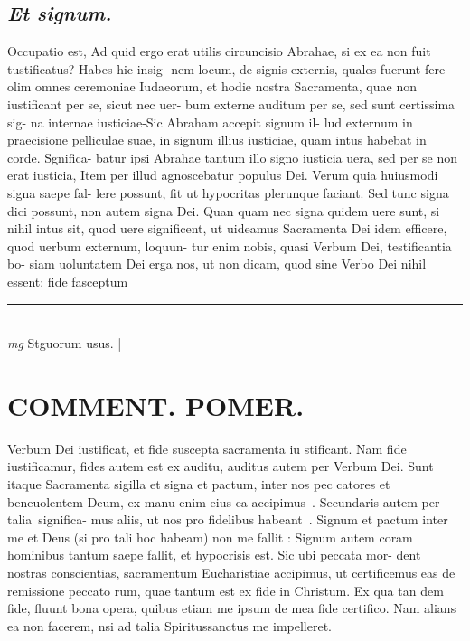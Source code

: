 \documentclass{article}
\begin{document}
\begin{pages}
\subsection*{\textit{Et signum. }}\pstart Occupatio est, Ad quid ergo erat utilis circuncisio Abrahae, si ex ea non fuit tustificatus? Habes hic insig- nem locum, de signis externis, quales fuerunt fere olim omnes ceremoniae Iudaeorum, et hodie nostra Sacramenta, quae non iustificant per se, sicut nec uer- bum externe auditum per se, sed sunt certissima sig- na internae iusticiae-Sic Abraham accepit signum il- lud externum in praecisione pelliculae suae, in signum illius iusticiae, quam intus habebat in corde. Sgnifica- batur ipsi Abrahae tantum illo signo iusticia uera, sed per se non erat iusticia, Item per illud agnoscebatur populus Dei. Verum quia huiusmodi signa saepe fal- lere possunt, fit ut hypocritas plerunque faciant. Sed tunc signa dici possunt, non autem signa Dei. Quan quam nec signa quidem uere sunt, si nihil intus sit, quod uere significent, ut uideamus Sacramenta Dei idem efficere, quod uerbum externum, loquun- tur enim nobis, quasi Verbum Dei, testificantia bo- siam uoluntatem Dei erga nos, ut non dicam, quod sine Verbo Dei nihil essent: fide fasceptum  \pend\pstart  \pend
\vspace{0.5cm}\noindent
\vspace{0.2cm}\rule{1cm}{0.2pt}\\ 
\hspace{0.2cm}\textit{mg}
\footnotesize Stguorum usus. 
\normalsize| 
\section*{COMMENT. POMER.  }\pstart Verbum Dei iustificat, et fide suscepta sacramenta iu stificant. Nam fide iustificamur, fides autem est ex auditu, auditus autem per Verbum Dei. Sunt itaque  Sacramenta sigilla et signa et pactum, inter nos pec catores et beneuolentem Deum, ex manu enim eius ea accipimus . Secundaris autem per talia significa- mus aliis, ut nos pro fidelibus habeant . Signum et pactum inter me et Deus (si pro tali hoc habeam) non me fallit : Signum autem coram hominibus tantum saepe fallit, et hypocrisis est. Sic ubi peccata mor- dent nostras conscientias, sacramentum Eucharistiae accipimus, ut certificemus eas de remissione peccato rum, quae tantum est ex fide in Christum. Ex qua tan dem fide, fluunt bona opera, quibus etiam me ipsum de mea fide certifico. Nam alians ea non facerem, nsi ad talia Spiritussanctus me impelleret.  \pend
{}
{}

\end{pages}
\end{document}
